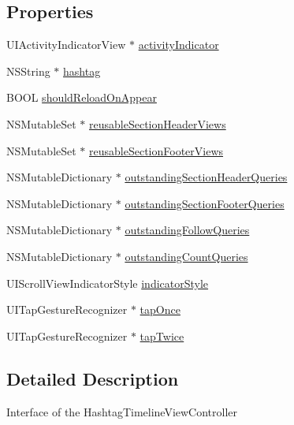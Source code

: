 \subsection*{Properties}
\begin{DoxyCompactItemize}
\item 
U\+I\+Activity\+Indicator\+View $\ast$ \hyperlink{interface_e_s_recent_view_controller_ae155cb84c814b33af8d964161a29a4c7}{activity\+Indicator}
\item 
N\+S\+String $\ast$ \hyperlink{interface_e_s_recent_view_controller_a6e722f2b15d4e7402de0c5d23ba51864}{hashtag}
\item 
B\+O\+O\+L \hyperlink{interface_e_s_recent_view_controller_a5c126b4f30492fb53e2129f72b72d45a}{should\+Reload\+On\+Appear}
\item 
N\+S\+Mutable\+Set $\ast$ \hyperlink{interface_e_s_recent_view_controller_ad516b063975428fb1070b452915e5a9d}{reusable\+Section\+Header\+Views}
\item 
N\+S\+Mutable\+Set $\ast$ \hyperlink{interface_e_s_recent_view_controller_a4dd828a7903849f7ed67dad524d6e1e6}{reusable\+Section\+Footer\+Views}
\item 
N\+S\+Mutable\+Dictionary $\ast$ \hyperlink{interface_e_s_recent_view_controller_aef7c45ea8ddfadc7182f14c3474954bc}{outstanding\+Section\+Header\+Queries}
\item 
N\+S\+Mutable\+Dictionary $\ast$ \hyperlink{interface_e_s_recent_view_controller_a59147e91883b4bf7c0ac1dff774a059c}{outstanding\+Section\+Footer\+Queries}
\item 
N\+S\+Mutable\+Dictionary $\ast$ \hyperlink{interface_e_s_recent_view_controller_a0f4d2611b615a9976521a98efe54aaf6}{outstanding\+Follow\+Queries}
\item 
N\+S\+Mutable\+Dictionary $\ast$ \hyperlink{interface_e_s_recent_view_controller_a4781916b5b111f1570d40cb7af6ff7e8}{outstanding\+Count\+Queries}
\item 
U\+I\+Scroll\+View\+Indicator\+Style \hyperlink{interface_e_s_recent_view_controller_ab65543661066860b3cedcf3866d5b2fc}{indicator\+Style}
\item 
U\+I\+Tap\+Gesture\+Recognizer $\ast$ \hyperlink{interface_e_s_recent_view_controller_a1058bd1b0a7d3c0eff171ac690d96533}{tap\+Once}
\item 
U\+I\+Tap\+Gesture\+Recognizer $\ast$ \hyperlink{interface_e_s_recent_view_controller_a9556191a79dab1b626512227348cbf5c}{tap\+Twice}
\end{DoxyCompactItemize}


\subsection{Detailed Description}
Interface of the Hashtag\+Timeline\+View\+Controller 


